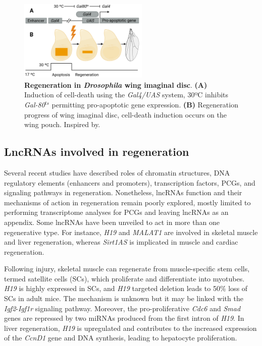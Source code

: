 \begin{figure}[!htb]
  \centering
  \includegraphics[width=0.55\textwidth]{img/introduction/induction_cell_death.png}
  \caption[Regeneration in \textit{Drosophila} wing imaginal disc]{\textbf{Regeneration in \textit{Drosophila} wing imaginal disc}. \textbf{(A)} Induction of cell-death using the \textit{Gal4/UAS} system, 30ºC inhibits \textit{Gal-80}$^{ts}$ permitting pro-apoptotic gene expression. \textbf{(B)} Regeneration progress of wing imaginal disc, cell-death induction occurs on the wing pouch. Inspired by.\autocite{hariharan_2017_imaginal}}
  \label{fig:imaginal-disc}
\end{figure}

\subsection{LncRNAs involved in regeneration}
\label{sub:lncRNA-reg}

Several recent studies have described roles of chromatin structures, DNA regulatory elements (enhancers and promoters), transcription factors, PCGs, and signaling pathways in regeneration.\autocite{vizcaya_2018,vizcaya_2020_chromatin,santabarbara_2015,blanco_2010} Nonetheless, lncRNAs function and their mechanisms of action in regeneration remain poorly explored, mostly limited to performing transcriptome analyses for PCGs and leaving lncRNAs as an appendix. Some lncRNAs have been unveiled to act in more than one regenerative type. For instance, \textit{H19} and \textit{MALAT1} are involved in skeletal muscle and liver regeneration,\autocite{sergeeva_2020_liver_regeneration,gonccalves_2017_skeletal} whereas \textit{Sirt1AS} is implicated in muscle and cardiac regeneration.\autocite{gonccalves_2017_skeletal,dong_2021_cardiomyocyte}

Following injury, skeletal muscle can regenerate from muscle-specific stem cells, termed satellite cells (SCs), which proliferate and differentiate into myotubes.\autocite{baghdadi_2018_skeletal} \textit{H19} is highly expressed in SCs, and \textit{H19} targeted deletion leads to 50\% loss of SCs in adult mice.\autocite{venkatraman_2013_h19} The mechanism is unknown but it may be linked with the \textit{Igf2}-\textit{Igf1r} signaling pathway.\autocite{gonccalves_2017_skeletal} Moreover, the pro-proliferative \textit{Cdc6} and \textit{Smad} genes are repressed by two miRNAs produced from the first intron of \textit{H19}.\autocite{dey_2014_h19} In liver regeneration, \textit{H19} is upregulated and contributes to the increased expression of the \textit{CcnD1} gene and DNA synthesis, leading to hepatocyte proliferation.\autocite{sergeeva_2020_liver_regeneration}

